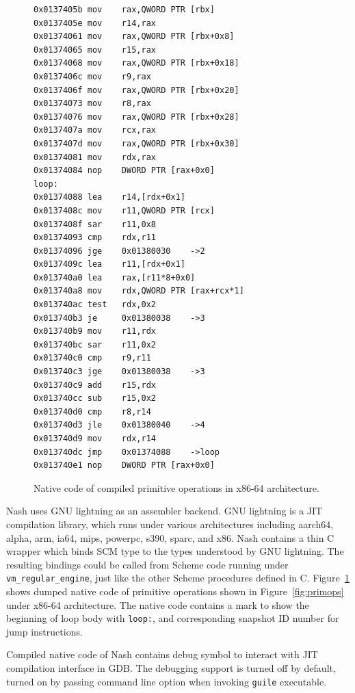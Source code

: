 \documentclass[preprint, numbers]{sigplanconf}
\begin{document}
\begin{figure}
  \centering
\begin{verbatim}
0x0137405b mov    rax,QWORD PTR [rbx]
0x0137405e mov    r14,rax
0x01374061 mov    rax,QWORD PTR [rbx+0x8]
0x01374065 mov    r15,rax
0x01374068 mov    rax,QWORD PTR [rbx+0x18]
0x0137406c mov    r9,rax
0x0137406f mov    rax,QWORD PTR [rbx+0x20]
0x01374073 mov    r8,rax
0x01374076 mov    rax,QWORD PTR [rbx+0x28]
0x0137407a mov    rcx,rax
0x0137407d mov    rax,QWORD PTR [rbx+0x30]
0x01374081 mov    rdx,rax
0x01374084 nop    DWORD PTR [rax+0x0]
loop:
0x01374088 lea    r14,[rdx+0x1]
0x0137408c mov    r11,QWORD PTR [rcx]
0x0137408f sar    r11,0x8
0x01374093 cmp    rdx,r11
0x01374096 jge    0x01380030    ->2
0x0137409c lea    r11,[rdx+0x1]
0x013740a0 lea    rax,[r11*8+0x0]
0x013740a8 mov    rdx,QWORD PTR [rax+rcx*1]
0x013740ac test   rdx,0x2
0x013740b3 je     0x01380038    ->3
0x013740b9 mov    r11,rdx
0x013740bc sar    r11,0x2
0x013740c0 cmp    r9,r11
0x013740c3 jge    0x01380038    ->3
0x013740c9 add    r15,rdx
0x013740cc sub    r15,0x2
0x013740d0 cmp    r8,r14
0x013740d3 jle    0x01380040    ->4
0x013740d9 mov    rdx,r14
0x013740dc jmp    0x01374088    ->loop
0x013740e1 nop    DWORD PTR [rax+0x0]
\end{verbatim}
\caption{Native code of compiled primitive operations in x86-64 architecture.}
\label{fig:ncode}
\end{figure}

Nash uses GNU lightning\cite{gnulightning} as an assembler backend.  GNU
lightning is a JIT compilation library, which runs under various architectures
including aarch64, alpha, arm, ia64, mips, powerpc, s390, sparc, and x86. Nash
contains a thin C wrapper which binds SCM type to the types understood by GNU
lightning. The resulting bindings could be called from Scheme code running
under \texttt{vm\_regular\_engine}, just like the other Scheme procedures
defined in C. Figure~\hyperref[fig:native]{\ref{fig:ncode}} shows dumped
native code of primitive operations shown in
Figure~\hyperref[fig:primops]{\ref{fig:primops}} under x86-64
architecture. The native code contains a mark to show the beginning of loop
body with \texttt{loop:}, and corresponding snapshot ID number for jump
instructions.

Compiled native code of Nash contains debug symbol to interact with JIT
compilation interface in GDB\cite{gdbdebugger}. The debugging support is
turned off by default, turned on by passing command line option when invoking
\texttt{guile} executable.
\end{document}
